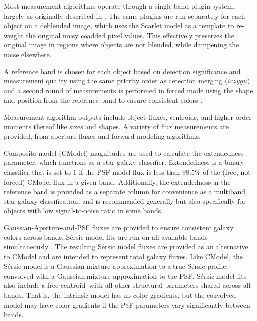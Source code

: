Most measurement algorithms operate through a single-band plugin system, largely as originally described in \citet{2018PASJ...70S...5B}.
The same plugins are run separately for each object on a deblended image, which uses the Scarlet model as a template to re-weight the original noisy coadded pixel values.
This effectively preserves the original image in regions where objects are not blended, while dampening the noise elsewhere.

A reference band is chosen for each object based on detection significance and measurement quality using the same priority order as detection merging ($irzygu$) and a second round of measurements is performed in forced mode using the shape and position from the reference band to ensure consistent colors \citep{2018PASJ...70S...5B}.

Measurement \gls{algorithm} outputs include object fluxes, centroids, and higher-order moments thereof like sizes and shapes. A variety of \gls{flux} measurements are provided, from aperture fluxes and forward modeling algorithms.

Composite model (CModel) magnitudes \citep{2004AJ....128..502A, 2018PASJ...70S...5B} are used to calculate the extendedness parameter, which functions as a star-galaxy classifier.
Extendedness is a binary classifier that is set to 1 if the PSF model flux is less than $98.5\%$ of the (free, not forced) CModel flux in a given band.
Additionally, the extendedness in the reference band is provided as a separate column for convenience as a multiband star-galaxy classification, and is recommended generally but also specifically for objects with low signal-to-noise ratio in some bands.

Gaussian-Aperture-and-PSF \citep[\gls{GAaP}][]{2008A&A...482.1053K, DMTN-190} fluxes are provided to ensure consistent galaxy colors across bands.
S\'ersic model \citep{1963BAAA....6...41S, 1968adga.book.....S} fits are run on all available bands simultaneously \cite[MultiProFit,][]{DMTN-312}.
The resulting S\'ersic model fluxes are provided as an alternative to CModel and are intended to represent total galaxy fluxes.
Like CModel, the S\'ersic model is a Gaussian mixture approximation to a true S\'ersic profile, convolved with a Gaussian mixture approximation to the \gls{PSF}.
S\'ersic model fits also include a free centroid, with all other structural parameters shared across all bands.
That is, the intrinsic model has no color gradients, but the convolved model may have color gradients if the \gls{PSF} parameters vary significantly between bands.

